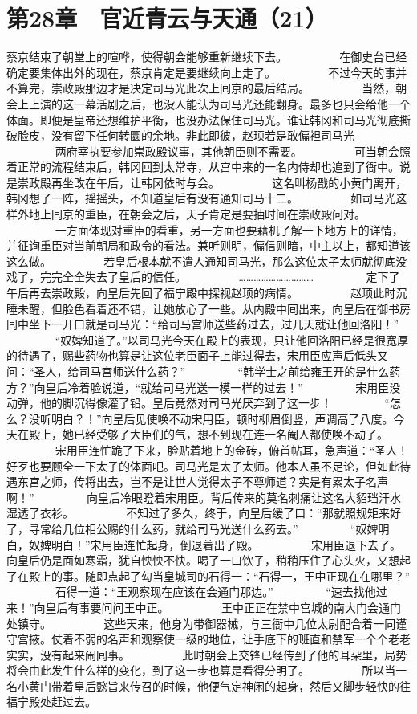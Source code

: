 \section{第28章　官近青云与天通（21）}

蔡京结束了朝堂上的喧哗，使得朝会能够重新继续下去。
　　
　　在御史台已经确定要集体出外的现在，蔡京肯定是要继续向上走了。
　　
　　不过今天的事并不算完，崇政殿那边才是决定司马光此次上囘京的最后结局。
　　
　　当然，朝会上上演的这一幕活剧之后，也没人能认为司马光还能翻身。最多也只会给他一个体面。即便是皇帝还想维护平衡，也没办法保住司马光。谁让韩冈和司马光彻底撕破脸皮，没有留下任何转圜的余地。非此即彼，赵顼若是敢偏袒司马光
　　
　　两府宰执要参加崇政殿议事，其他朝臣则不需要。
　　
　　可当朝会照着正常的流程结束后，韩冈回到太常寺，从宫中来的一名内侍却也追到了衙中。说是崇政殿再坐改在午后，让韩冈依时与会。
　　
　　这名叫杨戬的小黄门离开，韩冈想了一阵，摇摇头，不知道皇后有没有通知司马十二。
　　
　　如司马光这样外地上囘京的重臣，在朝会之后，天子肯定是要抽时间在崇政殿问对。
　　
　　一方面体现对重臣的看重，另一方面也要藉机了解一下地方上的详情，并征询重臣对当前朝局和政令的看法。兼听则明，偏信则暗，中主以上，都知道该这么做。
　　
　　若皇后根本就不遣人通知司马光，那么这位太子太师就彻底没戏了，完完全全失去了皇后的信任。
　　
　　…………………………
　　
　　定下了午后再去崇政殿，向皇后先回了福宁殿中探视赵顼的病情。
　　
　　赵顼此时沉睡未醒，但脸色看着还不错，让她放心了一些。从内殿中囘出来，向皇后在御书房囘中坐下一开口就是司马光：“给司马宫师送些药过去，过几天就让他回洛阳！”
　　
　　“奴婢知道了。”以司马光今天在殿上的表现，只让他回洛阳已经是很宽厚的待遇了，赐些药物也算是让这位老臣面子上能过得去，宋用臣应声后低头又问：“圣人，给司马宫师送什么药？”
　　
　　“韩学士之前给雍王开的是什么药方？”向皇后冷着脸说道，“就给司马光送一模一样的过去！”
　　
　　宋用臣没动弹，他的脚沉得像灌了铅。皇后竟然对司马光厌弃到了这一步！
　　
　　“怎么？没听明白？！”向皇后见使唤不动宋用臣，顿时柳眉倒竖，声调高了八度。今天在殿上，她已经受够了大臣们的气，想不到现在连一名阉人都使唤不动了。
　　
　　宋用臣连忙跪了下来，脸贴着地上的金砖，俯首帖耳，急声道：“圣人！好歹也要顾全一下太子的体面吧。司马光是太子太师。他本人虽不足论，但如此待遇东宫之师，传将出去，岂不是让世人觉得太子不尊师道？实是有累太子名声啊！”
　　
　　向皇后冷眼瞪着宋用臣。背后传来的莫名刺痛让这名大貂珰汗水湿透了衣衫。
　　
　　不知过了多久，终于，向皇后缓了口：“那就照规矩来好了，寻常给几位相公赐的什么药，就给司马光送什么药去。”
　　
　　“奴婢明白，奴婢明白！”宋用臣连忙起身，倒退着出了殿。
　　
　　宋用臣退下去了。向皇后仍是面如寒霜，犹自怏怏不快。喝了一口饮子，稍稍压住了心头火，又想起了在殿上的事。随即点起了勾当皇城司的石得一：“石得一，王中正现在在哪里？”
　　
　　石得一道：“王观察现在应该在会通门那边。”
　　
　　“速去找他过来！”向皇后有事要问问王中正。
　　
　　王中正正在禁中宫城的南大门会通门处镇守。
　　
　　这些天来，他身为带御器械，与三衙中几位太尉配合着一同谨守宫掖。仗着不弱的名声和观察使一级的地位，让手底下的班直和禁军一个个老老实实，没有起来闹囘事。
　　
　　此时朝会上交锋已经传到了他的耳朵里，局势将会由此发生什么样的变化，到了这一步也算是看得分明了。
　　
　　所以当一名小黄门带着皇后懿旨来传召的时候，他便气定神闲的起身，然后又脚步轻快的往福宁殿处赶过去。


